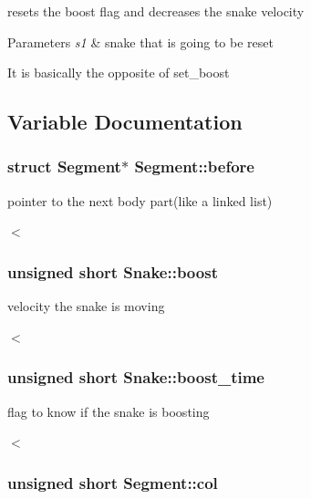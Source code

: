 resets the boost flag and decreases the snake velocity 


\begin{DoxyParams}{Parameters}
{\em s1} & snake that is going to be reset\\
\hline
\end{DoxyParams}
It is basically the opposite of set\+\_\+boost 

\subsection{Variable Documentation}
\subsubsection[{\texorpdfstring{before}{before}}]{\setlength{\rightskip}{0pt plus 5cm}struct {\bf Segment}$\ast$ Segment\+::before}\hypertarget{group__snake_ga60c4d032ff0baffc3c99c1630dae24e3}{}\label{group__snake_ga60c4d032ff0baffc3c99c1630dae24e3}


pointer to the next body part(like a linked list) 

$<$ 
\subsubsection[{\texorpdfstring{boost}{boost}}]{\setlength{\rightskip}{0pt plus 5cm}unsigned short Snake\+::boost}\hypertarget{group__snake_ga7339bbc2027ffeb1ce00f24a834610cc}{}\label{group__snake_ga7339bbc2027ffeb1ce00f24a834610cc}


velocity the snake is moving 

$<$ 
\subsubsection[{\texorpdfstring{boost\+\_\+time}{boost_time}}]{\setlength{\rightskip}{0pt plus 5cm}unsigned short Snake\+::boost\+\_\+time}\hypertarget{group__snake_ga0b46bc6b402fd8999c6998eca1806c3e}{}\label{group__snake_ga0b46bc6b402fd8999c6998eca1806c3e}


flag to know if the snake is boosting 

$<$ 
\subsubsection[{\texorpdfstring{col}{col}}]{\setlength{\rightskip}{0pt plus 5cm}unsigned short Segment\+::col}\hypertarget{group__snake_ga3369387554e0ec37bb04c153c3529ed9}{}\label{group__snake_ga3369387554e0ec37bb04c153c3529ed9}


